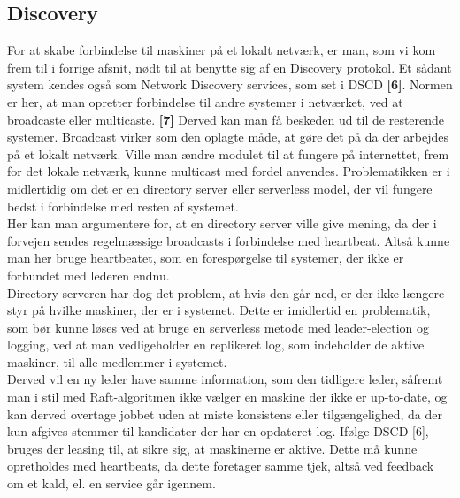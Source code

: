 \documentclass[a4paper,12pt]{article}
\begin{document}
\subsection{Discovery}
For at skabe forbindelse til maskiner på et lokalt netværk, er man, som vi kom frem til i forrige afsnit, nødt til at benytte sig af en Discovery protokol. Et sådant system kendes også som Network Discovery services, som set i DSCD \textbf{[6]}. Normen er her, at man opretter forbindelse til andre systemer i netværket, ved at broadcaste eller multicaste. \textbf{[7]} Derved kan man få beskeden ud til de resterende systemer. Broadcast virker som den oplagte måde, at gøre det på da der arbejdes på et lokalt netværk.
Ville man ændre modulet til at fungere på internettet, frem for det lokale netværk, kunne multicast med fordel anvendes.
Problematikken er i midlertidig om det er en directory server eller serverless model, der vil fungere bedst i forbindelse med resten af systemet.
\\[5px]
Her kan man argumentere for, at en directory server ville give mening, da der i forvejen sendes regelmæssige broadcasts i forbindelse med heartbeat. Altså kunne man her bruge heartbeatet, som en forespørgelse til systemer, der ikke er forbundet med lederen endnu.
\\
Directory serveren har dog det problem, at hvis den går ned, er der ikke længere styr på hvilke maskiner, der er i systemet. Dette er imidlertid en problematik, som bør kunne løses ved at bruge en serverless metode med leader-election og logging, ved at man vedligeholder en replikeret log, som indeholder de aktive maskiner, til alle medlemmer i systemet. 
\\
Derved vil en ny leder have samme information, som den tidligere leder, såfremt man i stil med Raft-algoritmen ikke vælger en maskine der ikke er up-to-date, og kan derved overtage jobbet uden at miste konsistens eller tilgængelighed, da der kun afgives stemmer til kandidater der har en opdateret log. Ifølge DSCD [6], bruges der leasing til, at sikre sig, at maskinerne er aktive. Dette må kunne opretholdes med heartbeats, da dette foretager samme tjek, altså ved feedback om et kald, el. en service går igennem.
\end{document}
